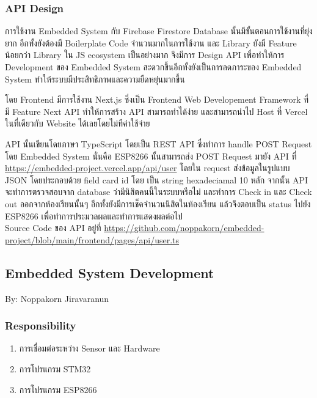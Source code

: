 \documentclass[fontsize=14pt]{extarticle}
\begin{document}
\subsubsection{API Design}
\par การใช้งาน Embedded System กับ Firebase Firestore Database นั้นมีขั้นตอนการใช้งานที่ยุ่งยาก อีกทั้งยังต้องมี Boilerplate Code จำนวนมากในการใช้งาน และ Library ยังมี Feature  น้อยกว่า Library ใน JS ecosystem เป็นอย่างมาก จึงมีการ Design API เพื่อทำให้การ Development ของ Embedded System สะดวกขึ้นอีกทั้งยังเป็นการลดภาระของ Embedded System ทำให้ระบบมีประสิทธิภาพและความยืดหยุ่นมากขึ้น
\par โดย Frontend มีการใช้งาน Next.js ซึ่งเป็น Frontend Web Developement Framework ที่มี Feature Next API ทำให้การสร้าง API สามารถทำได้ง่าย และสามารถนำไป Host ที่ Vercel ในที่เดียวกับ Website ได้เลยโดยไม่ทีค่าใช้จ่าย
\par API นั้นเขียนโดยภาษา TypeScript โดยเป็น REST API ซึ่งทำการ handle POST Request โดย Embedded System นั่นคือ ESP8266 นั้นสามารถส่ง POST Request มายัง API ที่ \url{https://embedded-project.vercel.app/api/user} โดยใน request ส่งข้อมูลในรูปแบบ JSON โดยประกอบด้วย field card id โดย เป็น string hexadeciamal 10 หลัก จากนั้น API จะทำการตรวจสอบจาก database ว่ามีนิสิตคนนี้ในระบบหรือไม่ และทำการ Check in และ Check out ออกจากห้องเรียนนั้นๆ อีกทั้งยังมีการเช็คจำนวนนิสิตในห้องเรียน แล้วจึงตอบเป็น status ไปยัง ESP8266 เพื่อทำการประมวลผลและทำการแสดงผลต่อไป\\
Source Code ของ API อยู่ที่ \url{https://github.com/noppakorn/embedded-project/blob/main/frontend/pages/api/user.ts}
\pagebreak
\subsection{Embedded System Development}
By: Noppakorn Jiravaranun\\
\subsubsection{Responsibility}
\begin{enumerate}
    \item การเชื่อมต่อระหว่าง Sensor และ Hardware
    \item การโปรแกรม STM32
    \item การโปรแกรม ESP8266
\end{enumerate}
\end{document}

